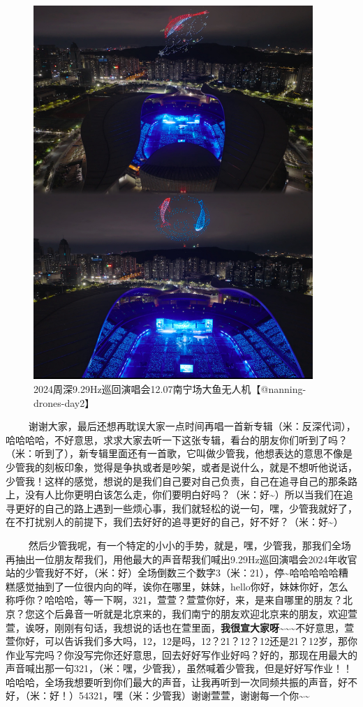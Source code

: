 \documentclass[]{ctexbook}
\begin{document}
\begin{figure}

{\centering \includegraphics[width=300pt]{img/nanning20241207/003} 

}

\caption{2024周深9.29Hz巡回演唱会12.07南宁场大鱼无人机【@nanning-drones-day2】}\label{fig:unnamed-chunk-149}
\end{figure}

   谢谢大家，最后还想再耽误大家一点时间再唱一首新专辑（米：反深代词），哈哈哈哈，不好意思，求求大家去听一下这张专辑，看台的朋友你们听到了吗？（米：听到了），新专辑里面还有一首歌，它叫做少管我，他想表达的意思不像是少管我的刻板印象，觉得是争执或者是吵架，或者是说什么，就是不想听他说话，少管我！这样的感觉，想说的是我们自己要对自己负责，自己在追寻自己的那条路上，没有人比你更明白该怎么走，你们要明白好吗？（米：好\textasciitilde）所以当我们在追寻更好的自己的路上遇到一些烦心事，我们就轻松的说一句，嘿，少管我就好了，在不打扰别人的前提下，我们去好好的追寻更好的自己，好不好？（米：好\textasciitilde）

   然后少管我呢，有一个特定的小小的手势，就是，嘿，少管我，那我们全场再抽出一位朋友帮我们，用他最大的声音帮我们喊出9.29Hz巡回演唱会2024年收官站的少管我好不好，（米：好）全场倒数三个数字3（米：21），停\textasciitilde 哈哈哈哈哈糟糕感觉抽到了一位很内向的咩，诶你在哪里，妹妹，hello你好，妹妹你好，怎么称呼你？哈哈哈，等一下啊，321，萱萱？萱萱你好，来，是来自哪里的朋友？北京？您这个后鼻音一听就是北京来的，我们南宁的朋友欢迎北京来的朋友，欢迎萱萱，诶呀，刚刚有句话，我想说的话也在萱里面，\textbf{我很宣大家呀\textasciitilde\textasciitilde\textasciitilde{}}不好意思，萱萱你好，可以告诉我们多大吗，12，12是吗，12？21？12？12还是21？12岁，那你作业写完吗？你没写完你还好意思，回去好好写作业好吗？好的，那现在用最大的声音喊出那一句321，（米：嘿，少管我），虽然喊着少管我，但是好好写作业！！哈哈哈，全场我想要听到你们最大的声音，让我再听到一次同频共振的声音，好不好，（米：好！）54321，嘿（米：少管我）谢谢萱萱，谢谢每一个你\textasciitilde\textasciitilde{}
\end{document}
